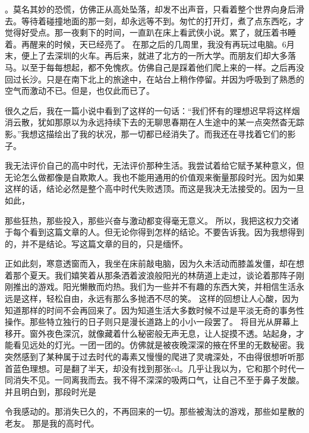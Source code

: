 \documentclass{article}
\begin{document}
\newpage 

。莫名其妙的恐慌，仿佛正从高处坠落，却发不出声音，只看着整个世界向身后滑去。等待着碰撞地面的那一刻，却永远等不到。匆忙的打开灯，煮了点东西吃，才觉得好受点。那一夜剩下的时间，一直趴在床上看武侠小说。累了，就压着书睡着。再醒来的时候，天已经亮了。 
在那之后的几周里，我没有再玩过电脑。6月末，便上了去深圳的火车。再后来，就进了北方的一所大学。而朋友们却大多落马。以至于每每想起，都不免愧疚。仿佛自己是踩着他们爬上来的一样。之后再没回过长沙。只是在南下北上的旅途中，在站台上稍作停留。并因为呼吸到了熟悉的空气而激动不已。但是，也仅此而已了。 

很久之后，我在一篇小说中看到了这样的一句话：“我们怀有的理想迟早将这样烟消云散，犹如那原以为永远持续下去的无聊思春期在人生途中的某一点突然杳无踪影。”我想这描绘出了我的状况，那一切都已经消失了。而我还在寻找着它们的影子。 

我无法评价自己的高中时代，无法评价那种生活。我尝试着给它赋予某种意义，但无论怎么做都像是自欺欺人。我也不能用通用的价值观来衡量那段时光。因为如果这样的话，结论必然是整个高中时代失败透顶。而这是我决无法接受的。因为一旦如此，

\newpage 

那些狂热，那些投入，那些兴奋与激动都变得毫无意义。 
所以，我把这权力交诸于每个看到这篇文章的人。但无论你得到怎样的结论。不要告诉我。因为我想得到的，并不是结论。写这篇文章的目的，只是缅怀。 

正如此刻，寒意透窗而入，我坐在床前敲电脑，因为久未活动而膝盖发僵，却在想着那个夏天。我们嬉笑着从那条洒着波浪般阳光的林荫道上走过，谈论着那阵子刚刚推出的游戏。阳光懒散而灼热。我们为一些并不有趣的东西大笑，并相信生活永远是这样，轻松自由，永远有那么多抛洒不尽的笑。 
这样的回想让人心酸，因为知道那样的时间不会再回来了。因为知道生活大多数时候不过是平淡无奇的事务性操作。那些特立独行的日子则只是漫长道路上的小小一段罢了。 
将目光从屏幕上移开。窗外夜色深沉，就像藏着什么秘密般无声无息，让人捉摸不透。站起身，才能看见远处的灯光。一团一团的。仿佛就是被夜晚深深的掖在怀里的无数秘密。我突然感到了某种属于过去时代的毒素又慢慢的爬进了灵魂深处，不由得很想听听那首蓝色理想。可是翻了半天，却没有找到那张cd。几乎让我以为，它和那个时代一同消失不见。一同离我而去。我不得不深深的吸两口气，让自己不至于鼻子发酸。并且明白到，那段时光是

\newpage 

令我感动的。那消失已久的，不再回来的一切。那些被淘汰的游戏，那些如星散的老友。 
那是我的高时代。
\end{document}

